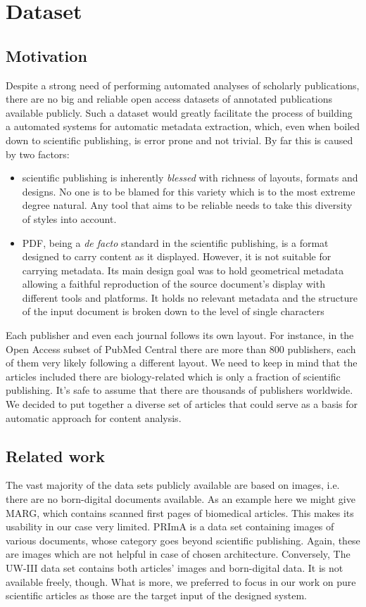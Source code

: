 \chapter{Dataset}
\section{Motivation}
Despite a strong need of performing automated analyses of scholarly publications, there are no big and reliable open access datasets of annotated publications available publicly. Such a dataset would greatly facilitate the process of building a automated systems for automatic metadata extraction, which, even when boiled down to scientific publishing, is error prone and not trivial. By far this is caused by two factors:
\begin{itemize}
\item scientific publishing is inherently \textit{blessed} with richness of layouts, formats and designs. No one is to be blamed for this variety which is to the most extreme degree natural. Any tool that aims to be reliable needs to take this diversity of styles into account.
\item PDF, being a \textit{de facto} standard in the scientific publishing, is a format designed to carry content as it displayed. However, it is not suitable for carrying metadata. Its main design goal was to hold geometrical metadata allowing a faithful reproduction of the source document's display with different tools and platforms. It holds no relevant metadata and the structure of the input document is broken down to the level of single characters
\end{itemize}
Each publisher and even each journal follows its own layout. For instance, in the Open Access subset of PubMed Central there are more than 800 publishers, each of them very likely following a different layout. We need to keep in mind that the articles included there are biology-related which is only a fraction of scientific publishing. It's safe to assume that there are thousands of publishers worldwide. We decided to put together a diverse set of articles that could serve as a basis for automatic approach for content analysis. 

\section{Related work}
The vast majority of the data sets publicly available are based on images, i.e. there are no born-digital documents available. As an example here we might give MARG, which contains scanned first pages of biomedical articles. This makes its usability in our case very limited. PRImA is a data set containing images of various documents, whose category goes beyond scientific publishing. Again, these are images which are not helpful in case of chosen architecture. Conversely, The UW-III data set contains both articles' images and born-digital data. It is not available freely, though. What is more, we preferred to focus in our work on pure scientific articles as those are the target input of the designed system.
